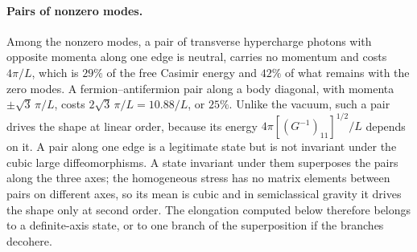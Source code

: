 \paragraph{Pairs of nonzero modes.}
Among the nonzero modes, a pair of transverse hypercharge photons with opposite momenta along one edge is neutral, carries no momentum and costs $4\pi/L$, which is $29\%$ of the free Casimir energy and $42\%$ of what remains with the zero modes. %
A fermion--antifermion pair along a body diagonal, with momenta $\pm\sqrt3\,\pi/L$, costs $2\sqrt3\,\pi/L=10.88/L$, or $25\%$. %
Unlike the vacuum, such a pair drives the shape at linear order, because its energy $4\pi[(G^{-1})_{11}]^{1/2}/L$ depends on it.
A pair along one edge is a legitimate state but is not invariant under the cubic large diffeomorphisms.
A state invariant under them superposes the pairs along the three axes; the homogeneous stress has no matrix elements between pairs on different axes, so its mean is cubic and in semiclassical gravity it drives the shape only at second order.
The elongation computed below therefore belongs to a definite-axis state, or to one branch of the superposition if the branches decohere.

